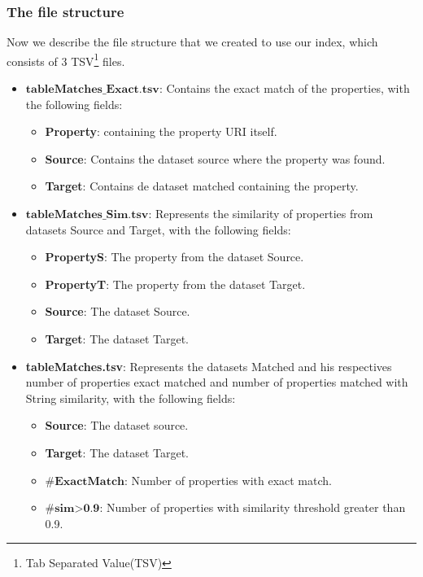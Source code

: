 \subsubsection{The file structure}
\label{sec:FileStructure}

Now we describe the file structure that we created to use our index, which consists of 3 TSV\footnote{Tab Separated Value(TSV)} files.
\begin{itemize}
    \item $\textbf{tableMatches\_Exact.tsv}$: Contains the exact match of the properties, with the following fields: 
    \begin{itemize}
        \item \textbf{Property}: containing the property URI itself.
        \item \textbf{Source}: Contains the dataset source where the property was found.
        \item \textbf{Target}: Contains de dataset matched containing the property.
    \end{itemize}
    \item $\textbf{tableMatches\_Sim.tsv}$: Represents the similarity of properties from datasets Source and Target, with the following fields:
    \begin{itemize}
        \item \textbf{PropertyS}: The property from the dataset Source.
        \item \textbf{PropertyT}: The property from the dataset Target.
        \item \textbf{Source}: The dataset Source.
        \item \textbf{Target}: The dataset Target.
    \end{itemize}
    \item \textbf{tableMatches.tsv}: Represents the datasets Matched and his respectives number of properties exact matched and number of properties matched with String similarity, with the following fields:
    \begin{itemize}
        \item \textbf{Source}: The dataset source.
        \item \textbf{Target}: The dataset Target.
        \item $\textbf{\#ExactMatch}$: Number of properties with exact match.
        \item $\textbf{\#sim>0.9}$: Number of properties with similarity threshold greater than 0.9.
    \end{itemize}
\end{itemize}

